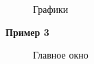 \documentclass[14pt, a4paper]{extarticle}
\begin{document}
	\begin{figure}[h!]
		\centering\caption{Графики}
	\end{figure}
	\newpage
	
	\textbf{Пример 3}
	\begin{figure}[h!]
		\centering\caption{Главное окно}
	\end{figure}
	
\end{document}
